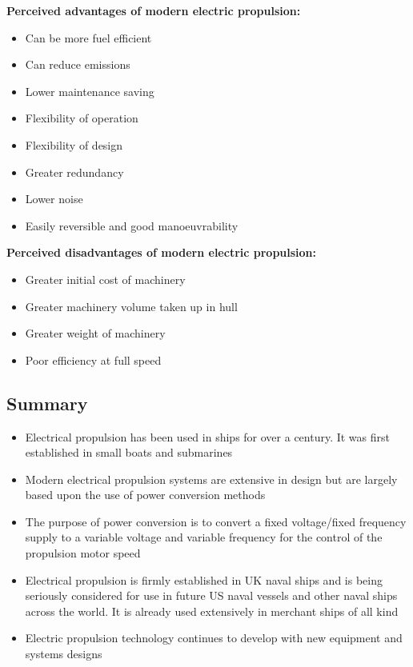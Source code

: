 \textbf{Perceived advantages of modern electric propulsion:}
\begin{itemize}
    \item Can be more fuel efficient
    \item Can reduce emissions
    \item Lower maintenance saving
    \item Flexibility of operation
    \item Flexibility of design
    \item Greater redundancy
    \item Lower noise
    \item Easily reversible and good manoeuvrability
\end{itemize}

\textbf{Perceived disadvantages of modern electric propulsion:}
\begin{itemize}
    \item Greater initial cost of machinery
    \item Greater machinery volume taken up in hull
    \item Greater weight of machinery
    \item Poor efficiency at full speed
\end{itemize}

\subsection{Summary}
\begin{itemize}
    \item Electrical propulsion has been used in ships for over a century. It was first established in small boats and submarines
    \item Modern electrical propulsion systems are extensive in design but are largely based upon the use of power conversion methods
    \item The purpose of power conversion is to convert a fixed voltage/fixed frequency supply to a variable voltage and variable frequency for the control of the propulsion motor speed
    \item Electrical propulsion is firmly established in UK naval ships and is being seriously considered for use in future US naval vessels and other naval ships across the world. It is already used extensively in merchant ships of all kind
    \item Electric propulsion technology continues to develop with new equipment and systems designs
\end{itemize}